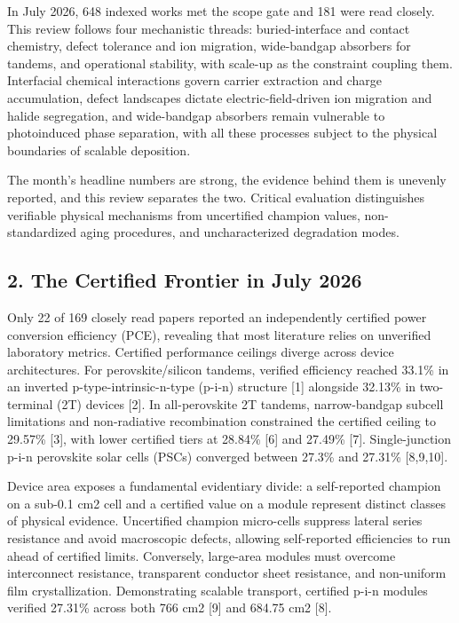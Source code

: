 \documentclass[
  11pt,
]{article}
\begin{document}
In July 2026, 648 indexed works met the scope gate and 181 were read
closely. This review follows four mechanistic threads: buried-interface
and contact chemistry, defect tolerance and ion migration, wide-bandgap
absorbers for tandems, and operational stability, with scale-up as the
constraint coupling them. Interfacial chemical interactions govern
carrier extraction and charge accumulation, defect landscapes dictate
electric-field-driven ion migration and halide segregation, and
wide-bandgap absorbers remain vulnerable to photoinduced phase
separation, with all these processes subject to the physical boundaries
of scalable deposition.

The month's headline numbers are strong, the evidence behind them is
unevenly reported, and this review separates the two. Critical
evaluation distinguishes verifiable physical mechanisms from uncertified
champion values, non-standardized aging procedures, and uncharacterized
degradation modes.

\subsection{2. The Certified Frontier in July
2026}\label{the-certified-frontier-in-july-2026}

Only 22 of 169 closely read papers reported an independently certified
power conversion efficiency (PCE), revealing that most literature relies
on unverified laboratory metrics. Certified performance ceilings diverge
across device architectures. For perovskite/silicon tandems, verified
efficiency reached 33.1\% in an inverted p-type-intrinsic-n-type (p-i-n)
structure {[}1{]} alongside 32.13\% in two-terminal (2T) devices
{[}2{]}. In all-perovskite 2T tandems, narrow-bandgap subcell
limitations and non-radiative recombination constrained the certified
ceiling to 29.57\% {[}3{]}, with lower certified tiers at 28.84\%
{[}6{]} and 27.49\% {[}7{]}. Single-junction p-i-n perovskite solar
cells (PSCs) converged between 27.3\% and 27.31\% {[}8,9,10{]}.

Device area exposes a fundamental evidentiary divide: a self-reported
champion on a sub-0.1 cm2 cell and a certified value on a module
represent distinct classes of physical evidence. Uncertified champion
micro-cells suppress lateral series resistance and avoid macroscopic
defects, allowing self-reported efficiencies to run ahead of certified
limits. Conversely, large-area modules must overcome interconnect
resistance, transparent conductor sheet resistance, and non-uniform film
crystallization. Demonstrating scalable transport, certified p-i-n
modules verified 27.31\% across both 766 cm2 {[}9{]} and 684.75 cm2
{[}8{]}.
\end{document}
